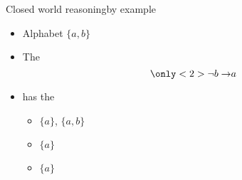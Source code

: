 \begin{frame}{Closed world reasoning}{by example}
  \bigskip
  \begin{itemize}
  \item Alphabet $\{a,b\}$
    \medskip
  \item The 
    \[
      \only<2>{\neg b\to} a
    \]
  \item[] has the
    \par\smallskip
    \begin{itemize}\normalsize
    \item {}         $\{a\}$, $\{a,b\}$
      \smallskip
    \item {} $\{a\}$
      \smallskip
    \item {}  $\{a\}$
    \end{itemize}
  \end{itemize}
\end{frame}
%
